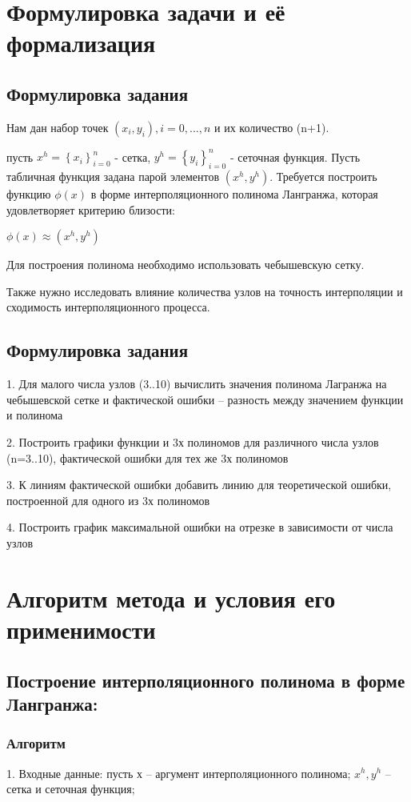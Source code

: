 \documentclass{article}
\begin{document}
	\newpage
	
	\section{Формулировка задачи и её формализация}
	\subsection{Формулировка задания}
	Нам дан набор точек $(x_i,y_i), i = 0,..., n$ и их количество (n+1).
	
	пусть $x^h = \left\{x_i\right\}^n_{i=0}$ - сетка, $y^h = \left\{y_i\right\}^n_{i=0}$ - сеточная функция. Пусть табличная функция задана парой элементов $(x^h,y^h)$. Требуется построить функцию $\phi(x)$ в форме интерполяционного полинома Лангранжа, которая удовлетворяет критерию близости:
	
	$\phi(x) \approx (x^h,y^h)$
	
	Для построения полинома необходимо использовать чебышевскую сетку.
	
	Также нужно исследовать влияние количества узлов на точность интерполяции и сходимость интерполяционного процесса.
	
	\subsection{Формулировка задания}
	1. Для малого числа узлов (3..10) вычислить значения полинома Лагранжа на чебышевской сетке и фактической ошибки – разность между значением функции и полинома
	
	2. Построить графики функции и 3х полиномов для различного числа узлов (n=3..10), фактической ошибки для тех же 3х полиномов
	
	3. К линиям фактической ошибки добавить линию для теоретической ошибки, построенной для одного из 3х полиномов
	
	4. Построить график максимальной ошибки на отрезке в зависимости от числа узлов
	
	\section{Алгоритм метода и условия его применимости}   
	
	\subsection{Построение интерполяционного полинома в форме Лангранжа:}
	\subsubsection{Алгоритм}
	1. Входные данные: пусть х – аргумент интерполяционного полинома; $x^h,y^h$ – сетка и сеточная функция;  
	
\end{document}
